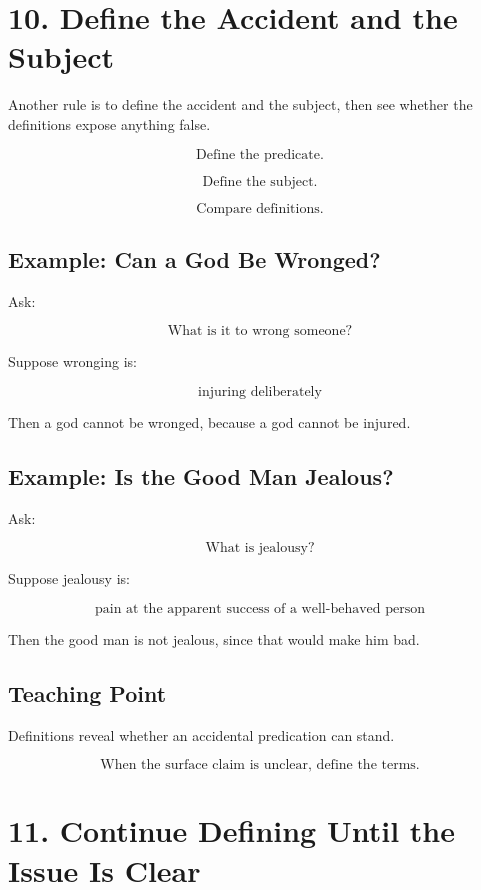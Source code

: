 \documentclass[12pt]{article}
\begin{document}
\section*{10. Define the Accident and the Subject}

Another rule is to define the accident and the subject, then see whether the
definitions expose anything false.

\[
\text{Define the predicate.}
\]

\[
\text{Define the subject.}
\]

\[
\text{Compare definitions.}
\]

\subsection*{Example: Can a God Be Wronged?}

Ask:

\[
\text{What is it to wrong someone?}
\]

Suppose wronging is:

\[
\text{injuring deliberately}
\]

Then a god cannot be wronged, because a god cannot be injured.

\subsection*{Example: Is the Good Man Jealous?}

Ask:

\[
\text{What is jealousy?}
\]

Suppose jealousy is:

\[
\text{pain at the apparent success of a well-behaved person}
\]

Then the good man is not jealous, since that would make him bad.

\subsection*{Teaching Point}

Definitions reveal whether an accidental predication can stand.

\[
\boxed{
\text{When the surface claim is unclear, define the terms.}
}
\]

\section*{11. Continue Defining Until the Issue Is Clear}
\end{document}
